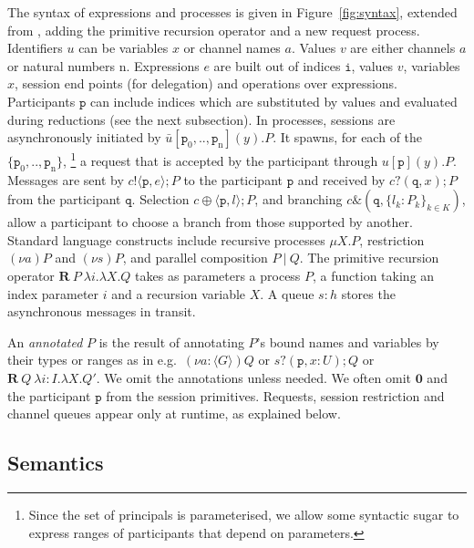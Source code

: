 \documentclass{LMCS}
\newcommand{\ptilde}[1]{{\ensuremath{#1}}}
\newcommand{\sr}[4]{\ensuremath{\bar{#1}[#2](#3).#4}}
\newcommand{\ssa}[4]{\ensuremath{#1[#2](#3).#4}}
\newcommand{\pp}{\ensuremath{\at{\p}}}
\newcommand{\ccc}{\ensuremath{c}}
\newcommand{\e}{\ensuremath{e}}
\newcommand{\x}{\ensuremath{x}}
\newcommand{\participant}[1]{\ensuremath{\mathtt{#1}}}
\newcommand{\q}{\ensuremath{\participant{q}}}
\newcommand{\p}{\ensuremath{\participant{p}}}
\newcommand{\pc}{\Par}
\newcommand{\s}{\ensuremath{s}}
\newcommand{\X}{\ensuremath{X}}
\newcommand{\inact}{\ensuremath{\mathbf{0}}}
\newcommand{\nuc}[2]{\ensuremath{(\nu #1)#2}}
\newcommand{\h}{\ensuremath{h}}
\newcommand{\at}[1]{\ensuremath{\ptilde{#1}}}
\newcommand{\Par}{\ensuremath{\ |\ }}
\newcommand{\RECSEQP}[4]{\ensuremath{\mathbf{R} \ #1\ \lambda #2.\lambda #3.#4}}
\newcommand{\ENCan}[1]{\langle #1 \rangle}
\newcommand{\Pout}[4]{\ensuremath{#1!\langle #2,#3\rangle;#4}}
\newcommand{\Pin}[4]{\ensuremath{#1?(#2,#3);#4}}
\newcommand{\Psel}[4]{\ensuremath{#1\oplus\langle#2,#3\rangle;#4}}
\newcommand{\Pbranch}[2]{\ensuremath{#1\&(#2,\{l_k:\PP_k\}_{k\in K})}}
\newcommand{\y}{\ensuremath{y}}
\newcommand{\Ia}{\ensuremath{a}}
\newcommand{\Iu}{\ensuremath{u}}
\newcommand{\Iv}{\ensuremath{v}}
\newcommand{\ii}{\ensuremath{i}}
\newcommand{\n}{\ensuremath{\mathrm{n}}}
\newcommand{\uu}{\ensuremath{u}}
\newcommand{\II}{\ensuremath{I}}
\newcommand{\PP}{\ensuremath{P}}
\newcommand{\QQ}{\ensuremath{Q}}
\newcommand{\tii}{\ensuremath{\mathtt{i}}}
\begin{document}
 
The syntax of expressions and processes is given in Figure~\ref{fig:syntax},
extended from \cite{BettiniCDLDY08LONG}, adding the primitive recursion operator and
a new request process.  Identifiers $\Iu$ can be variables $\x$ or
channel names $\Ia$. Values $\Iv$ are either channels $\Ia$ or natural numbers $\n$.
Expressions $e$ are built out of indices
$\tii$, values $\Iv$, variables $\x$, session end points (for delegation) and
operations over expressions.
Participants $\pp$ can include indices which 
are substituted by values and evaluated during reductions (see 
the next subsection). 
In processes, sessions are asynchronously initiated by $\sr\uu{\p_0,..,\p_\n}\y\PP$. 
It spawns, for each of the $\{\p_0,..,\p_\n\}$, 
\footnote{Since the set of principals is parameterised, we allow some syntactic
sugar to express ranges of participants that depend on parameters.}
a request that is accepted by the participant through $\ssa\uu\p\y\PP$. 
Messages
are sent by $\Pout{\ccc}{\p}{\e}{\PP}$ to the participant $\p$ 
and received by $\Pin{\ccc}{\q}{\x}{\PP}$ from the participant $\q$.  
Selection $\Psel{\ccc}{\p}{l}{\PP}$, and branching $\Pbranch{\ccc}{\q}$, allow a
participant to choose a branch from those supported by another.  Standard
language constructs include recursive processes $\mu \X.P$, restriction
$\nuc{\Ia}{\PP}$ and
$\nuc{s}{\PP}$,  and
parallel composition $\PP \pc \QQ$.
The primitive recursion operator $\RECSEQP{\PP}{\ii}{\X}{\QQ}$ takes as
parameters a process $\PP$, a function taking an index parameter $\ii$ and a
recursion variable $\X$. A queue $\s:\h$ stores the asynchronous messages in
transit.


\label{par:annotated}
An {\em annotated} $P$ is the result of annotating $P$'s bound names and
variables by their types or ranges as in e.g.~$(\nu a\!:\!\ENCan{G})Q$ or
$s?(\pp,x\!:\! U);Q$ or 
$\RECSEQP{\QQ}{\ii\!:\!\II}{\X}{\QQ'}$.
We omit the annotations 
unless needed.  We often omit $\inact$ and the participant $\p$ from the session
primitives.  Requests, session restriction and channel queues appear only at
runtime, as explained below.



\subsection{Semantics}
\label{subsec:semantics}
\end{document}
